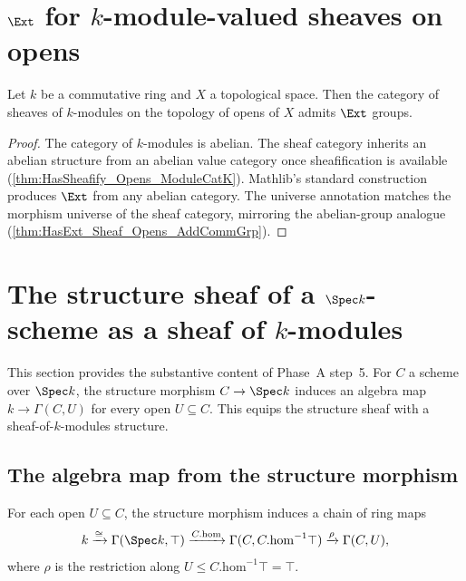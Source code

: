 \section{\(\Ext\) for \(k\)-module-valued sheaves on opens}
\label{sec:moduleK_ext}

\begin{theorem}
  \label{thm:HasExt_Sheaf_Opens_ModuleCatK}

  Let \(k\) be a commutative ring and \(X\) a topological space. Then the category of sheaves of \(k\)-modules on the topology of opens of \(X\) admits \(\Ext\) groups.
\end{theorem}

\begin{proof}


\leanok
  The category of \(k\)-modules is abelian. The sheaf category inherits an abelian structure from an abelian value category once sheafification is available (\cref{thm:HasSheafify_Opens_ModuleCatK}). Mathlib's standard construction produces \(\Ext\) from any abelian category. The universe annotation matches the morphism universe of the sheaf category, mirroring the abelian-group analogue (\cref{thm:HasExt_Sheaf_Opens_AddCommGrp}).
\end{proof}

\section{The structure sheaf of a \(\Spec k\)-scheme as a sheaf of \(k\)-modules}
\label{sec:scheme_toModuleKSheaf}

This section provides the substantive content of Phase~A step~5. For \(C\) a scheme over \(\Spec k\), the structure morphism \(C \to \Spec k\) induces an algebra map \(k \to \Gamma(C, U)\) for every open \(U \subseteq C\). This equips the structure sheaf with a sheaf-of-\(k\)-modules structure.

\subsection{The algebra map from the structure morphism}

For each open \(U \subseteq C\), the structure morphism induces a chain of ring maps
\[
  k \xrightarrow{\cong} \Gamma(\Spec k, \top) \xrightarrow{C.\mathrm{hom}} \Gamma(C, C.\mathrm{hom}^{-1}\top) \xrightarrow{\rho} \Gamma(C, U),
\]
where \(\rho\) is the restriction along \(U \le C.\mathrm{hom}^{-1}\top = \top\).


